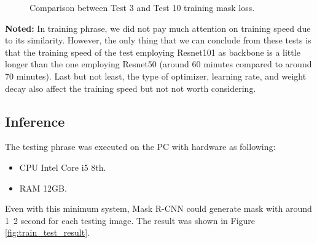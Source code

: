	\begin{figure}[H]
		\centering
		\hfill %
		\hfill %
		\caption{Comparison between Test 3 and Test 10 training mask loss.}
		\label{fig:mask_loss_12}
	\end{figure}

	\textbf{Noted:} In training phrase, we did not pay much attention on training speed due to its similarity. However, the only thing that we can conclude from these tests is that the training speed of the test employing Resnet101 as backbone is a little longer than the one employing Resnet50 (around 60 minutes compared to around 70 minutes). Last but not least, the type of optimizer, learning rate, and weight decay also affect the training speed but not not worth considering.
	
\subsection{Inference}
\label{subsection:mrcnn_inference}
\noindent
	
	The testing phrase was executed on the PC with hardware as following:
	
	\begin{itemize}
		\item CPU Intel Core i5 8th.
		\item RAM 12GB.
	\end{itemize}
	
	Even with this minimum system, Mask R-CNN could generate mask with around 1~2 second for each testing image. The result was shown in Figure \ref{fig:train_test_result}.
	
